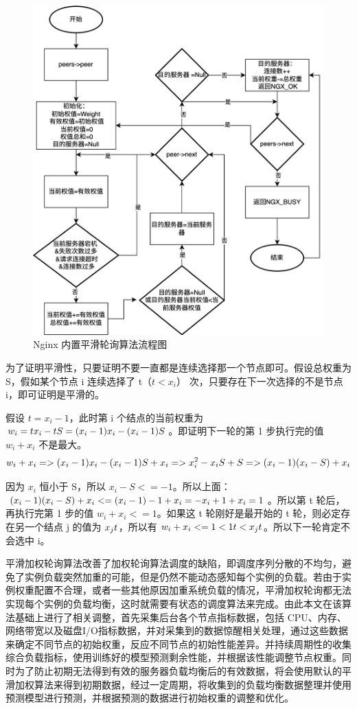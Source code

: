 \begin{figure}[htbp]
	\centering
	\includegraphics[width=.8\textwidth]{figures/smooth_weight.png}
	\caption{Nginx 内置平滑轮询算法流程图}
	\label{pinghualunxun}
\end{figure}

为了证明平滑性，只要证明不要一直都是连续选择那一个节点即可。假设总权重为 S，假如某个节点 i 连续选择了 t（$t < x_i$） 次，只要存在下一次选择的不是节点 i，即可证明是平滑的。

假设 $t = x_i - 1$，此时第 i 个结点的当前权重为 $w_i = t \* x_i - t \* S = (x_i - 1) \* x_i - (x_i - 1) \* S$。即证明下一轮的第 1 步执行完的值 $w_i + x_i$ 不是最大。
\begin{equation}
	w_i + x_i => (x_i - 1) \* x_i - (x_i - 1) \* S + x_i =>x_i^2 - x_i \* S + S => (x_i - 1) \* (x_i - S) + x_i
\end{equation}

因为 $x_i$ 恒小于 S，所以 $x_i - S <= -1$。所以上面：$(x_i - 1) \* (x_i - S) + x_i <= (x_i - 1) \* -1 + x_i = -x_i + 1 + x_i = 1$。所以第 t 轮后，再执行完第 1 步的值 $w_i + x_i <= 1$。如果这 t 轮刚好是最开始的 t 轮，则必定存在另一个结点 j 的值为 $x_j \* t$，所以有 $w_i + x_i <= 1 < 1 \* t < x_j \* t$。所以下一轮肯定不会选中 i。

平滑加权轮询算法改善了加权轮询算法调度的缺陷，即调度序列分散的不均匀，避免了实例负载突然加重的可能，但是仍然不能动态感知每个实例的负载。若由于实例权重配置不合理，或者一些其他原因加重系统负载的情况，平滑加权轮询都无法实现每个实例的负载均衡，这时就需要有状态的调度算法来完成。由此本文在该算法基础上进行了相关调整，首先采集后台各个节点指标数据，包括 CPU、内存、网络带宽以及磁盘I/O指标数据，并对采集到的数据惊醒相关处理，通过这些数据来确定不同节点的初始权重，反应不同节点的初始性能差异。并持续周期性的收集综合负载指标，使用训练好的模型预测剩余性能，并根据该性能调整节点权重。同时为了防止初期无法得到有效的服务器负载均衡后的有效数据，将会使用默认的平滑加权算法来得到初期数据，经过一定周期，将收集到的负载均衡数据整理并使用预测模型进行预测，并根据预测的数据进行初始权重的调整和优化。

